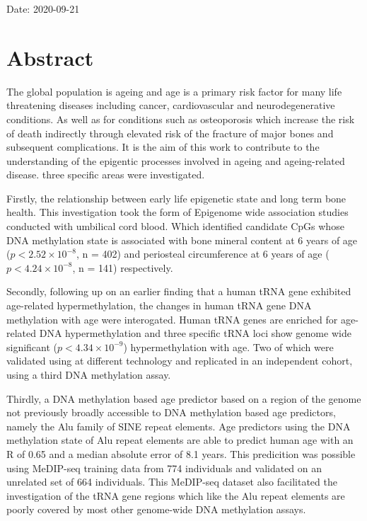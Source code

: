 \documentclass[
]{book}
\begin{document}
Date: 2020-09-21

\newpage

\hypertarget{abstract}{%
\chapter*{Abstract}\label{abstract}}

The global population is ageing and age is a primary risk factor for many life threatening diseases including cancer, cardiovascular and neurodegenerative conditions.
As well as for conditions such as osteoporosis which increase the risk of death indirectly through elevated risk of the fracture of major bones and subsequent complications.
It is the aim of this work to contribute to the understanding of the epigentic processes involved in ageing and ageing-related disease.
three specific areas were investigated.

Firstly, the relationship between early life epigenetic state and long term bone health. This investigation took the form of Epigenome wide association studies conducted with umbilical cord blood.
Which identified candidate CpGs whose DNA methylation state is associated with bone mineral content at 6 years of age (\(p < 2.52\times 10^{-8}\), n = 402) and periosteal circumference at 6 years of age (\(p < 4.24\times 10^{-8}\), n = 141) respectively.

Secondly, following up on an earlier finding that a human tRNA gene exhibited age-related hypermethylation, the changes in human tRNA gene DNA methylation with age were interogated.
Human tRNA genes are enriched for age-related DNA hypermethylation and three specific tRNA loci show genome wide significant (\(p < 4.34\times10^{-9}\)) hypermethylation with age.
Two of which were validated using at different technology and replicated in an independent cohort, using a third DNA methylation assay.

Thirdly, a DNA methylation based age predictor based on a region of the genome not previously broadly accessible to DNA methylation based age predictors, namely the Alu family of SINE repeat elements.
Age predictors using the DNA methylation state of Alu repeat elements are able to predict human age with an R of 0.65 and a median absolute error of 8.1 years.
This predicition was possible using MeDIP-seq training data from 774 individuals and validated on an unrelated set of 664 individuals.
This MeDIP-seq dataset also facilitated the investigation of the tRNA gene regions which like the Alu repeat elements are poorly covered by most other genome-wide DNA methylation assays.
\end{document}
